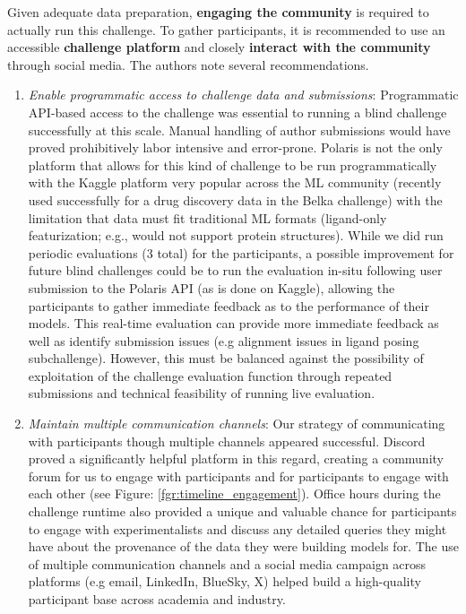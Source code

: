 \documentclass[journal=jcim,manuscript=article]{achemso}
\begin{document}
{Given adequate data preparation, \textbf{engaging the community} is required to actually run this challenge. To gather participants, it is recommended to use an accessible \textbf{challenge platform} and closely \textbf{interact with the community} through social media. The authors note several recommendations.
\begin{enumerate}
    \item \textit{Enable programmatic access to challenge data and submissions}: Programmatic API-based access to the challenge was essential to running a blind challenge successfully at this scale. Manual handling of author submissions would have proved prohibitively labor intensive and error-prone. Polaris is not the only platform that allows for this kind of challenge to be run programmatically with the  Kaggle platform very popular across the ML community (recently used successfully for a drug discovery data in the Belka challenge\cite{quigley2024belka}) with the limitation that data must fit traditional ML formats (ligand-only featurization; e.g., would not support protein structures). While we did run periodic evaluations (3 total) for the participants, a possible improvement for future blind challenges could be to run the evaluation in-situ following user submission to the Polaris API (as is done on Kaggle), allowing the participants to gather immediate feedback as to the performance of their models. This real-time evaluation can provide more immediate feedback as well as identify submission issues (e.g alignment issues in ligand posing subchallenge). However, this must be balanced against the possibility of exploitation of the challenge evaluation function through repeated submissions and technical feasibility of running live evaluation.
    \item \textit{Maintain multiple communication channels}: Our strategy of communicating with participants though multiple channels appeared successful. Discord proved a significantly helpful platform in this regard, creating a community forum for us to engage with participants and for participants to engage with each other (see Figure: \ref{fgr:timeline_engagement}). Office hours during the challenge runtime also provided a unique and valuable chance for participants to engage with experimentalists and discuss any detailed queries they might have about the provenance of the data they were building models for. The use of multiple communication channels and a social media campaign across platforms (e.g email, LinkedIn, BlueSky, X) helped build a high-quality participant base across academia and industry.
    

\end{enumerate}}
\end{document}

